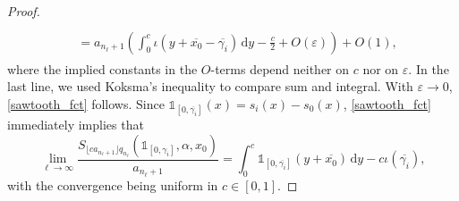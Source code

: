 \documentclass[AHL,Unicode,longabstracts,published]{cedram}
\newcommand{\rmd}{\mathrm{d}}
\newcommand{\kj}{n_{\ell}}
\begin{document}
\begin{proof}
\begin{multline*}
\begin{aligned}
\\
&= a_{\kj+1}\left(\int_{0}^{c} \iota\left(y + \overline{x_0}- \overline{\gamma_i}\right) \,\rmd y - \frac{c}{2} + O(\varepsilon) \right) + O(1),
\end{aligned}
\end{multline*}
where the implied constants in the $O$-terms depend neither on $c$ nor on $\varepsilon$. In the last line, we used Koksma's inequality to compare sum and integral. With $\varepsilon \to 0$, \eqref{sawtooth_fct} follows. Since $\mathds{1}_{[0,\overline{\gamma_i}]}(x) = s_i(x)-s_0(x)$, \eqref{sawtooth_fct} immediately implies that
\begin{equation*}
\lim_{\ell \to \infty} \frac{S_{ \lfloor c a_{\kj+1}\rfloor q_{\kj}}(\mathds{1}_{[0,\gamma_i]},\alpha,x_0)}{a_{\kj+1}} = \int_{0}^{c} \mathds{1}_{\left[0, \overline{\gamma_i}\right]}\left(y + \overline{x_0}\right) \,\rmd y - c\iota(\overline{\gamma_i}),
\end{equation*}
with the convergence being uniform in $c \in [0,1]$.
\end{proof}
\end{document}
